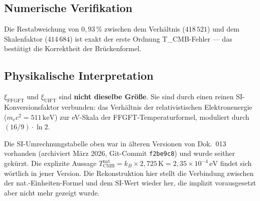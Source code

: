 \subsection*{Numerische Verifikation}

\begin{center}
\renewcommand{\arraystretch}{1.35}
{\small
{}
}
\end{center}

Die Restabweichung von $0{,}93\,\%$ zwischen dem Verhältnis ($418\,521$) und dem
Skalenfaktor ($414\,684$) ist exakt der erste Ordnung T\_CMB-Fehler — das
bestätigt die Korrektheit der Brückenformel.

\subsection*{Physikalische Interpretation}

$\xi_\text{FFGFT}$ und $\xi_\text{UIFT}$ sind \textbf{nicht dieselbe Größe}.
Sie sind durch einen reinen SI-Konversionsfaktor verbunden: das Verhältnis der
relativistischen Elektronenergie ($m_ec^2 = 511\,\text{keV}$) zur eV-Skala der
FFGFT-Temperaturformel, moduliert durch $(16/9)\cdot\ln 2$.

Die SI-Umrechnungstabelle oben war in älteren Versionen von Dok.~013 vorhanden
(archiviert März 2026, Git-Commit \texttt{f2be9c8}) und wurde seither gekürzt.
Die explizite Aussage
$T_\text{CMB}^\text{nat} = k_B \times 2{,}725\,\text{K} = 2{,}35\times10^{-4}\,\text{eV}$
findet sich wörtlich in jener Version. Die Rekonstruktion hier stellt die
Verbindung zwischen der nat.-Einheiten-Formel und dem SI-Wert wieder her,
die implizit vorausgesetzt aber nicht mehr gezeigt wurde.


